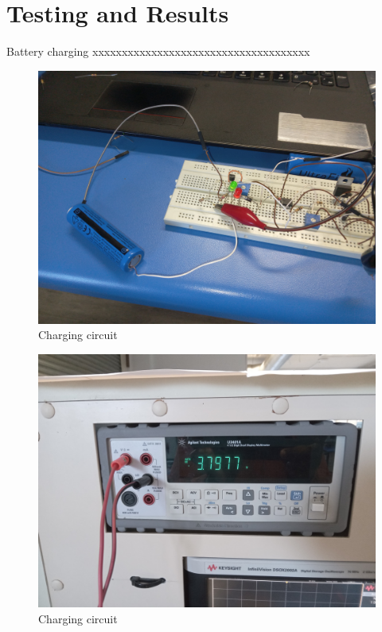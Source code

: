 \documentclass[class=report,11pt,crop=false]{standalone}
\begin{document}
	\section{Testing and Results}
	
	Battery charging xxxxxxxxxxxxxxxxxxxxxxxxxxxxxxxxxxxxx
	\begin{figure}[h!]
		\centering
		\includegraphics[width=0.8\linewidth]{Figures/Battery chargerG.jpg}
		\caption{Charging circuit}
		\label{fig: P5}
		
	\end{figure}
	
		\begin{figure}[h!]
		\centering
		\includegraphics[width=0.8\linewidth]{Figures/Battey voltageC.jpg}
		\caption{Charging circuit}
		\label{fig: P6}
	\end{figure}
	
\end{document}
